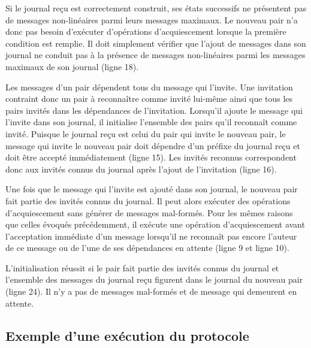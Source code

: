 Si le journal reçu est correctement construit, ses états successifs ne présentent pas de messages non-linéaires parmi leurs messages maximaux.
Le nouveau pair n'a donc pas besoin d'exécuter d'opérations d'acquiescement lorsque la première condition est remplie.
Il doit simplement vérifier que l'ajout de messages dans son journal ne conduit pas à la présence de messages non-linéaires parmi les messages maximaux de son journal (ligne 18).

Les messages d'un pair dépendent tous du message qui l'invite.
Une invitation contraint donc un pair à reconnaître comme invité lui-même ainsi que tous les pairs invités dans les dépendances de l'invitation.
Lorsqu'il ajoute le message qui l'invite dans son journal, il initialise l'ensemble des pairs qu'il reconnaît comme invité.
Puisque le journal reçu est celui du pair qui invite le nouveau pair, le message qui invite le nouveau pair doit dépendre d'un préfixe du journal reçu et doit être accepté immédiatement (ligne 15).
Les invités reconnus correspondent donc aux invités connus du journal après l'ajout de l'invitation (ligne 16).

Une fois que le message qui l'invite est ajouté dans son journal, le nouveau pair fait partie des invités connus du journal.
Il peut alors exécuter des opérations d'acquiescement sans générer de messages mal-formés.
Pour les mêmes raisons que celles évoqués précédemment, il exécute une opération d'acquiescement avant l'acceptation immédiate d'un message lorsqu'il ne reconnaît pas encore l'auteur de ce message ou de l'une de ses dépendances en attente (ligne 9 et ligne 10).

L'initialisation réussit si le pair fait partie des invités connus du journal et l'ensemble des messages du journal reçu figurent dans le journal du nouveau pair (ligne 24).
Il n'y a pas de messages mal-formés et de message qui demeurent en attente.





\subsection{Exemple d'une exécution du protocole}

